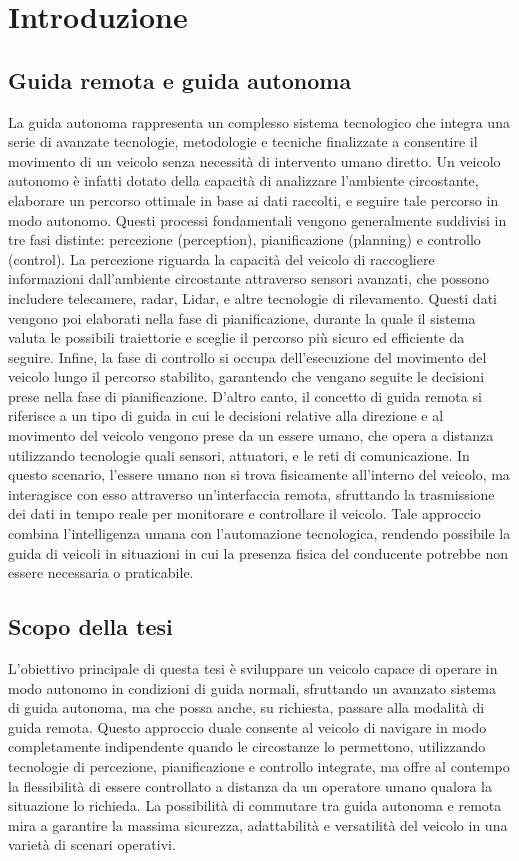 \section{Introduzione}
\subsection{Guida remota e guida autonoma}
La guida autonoma rappresenta un complesso sistema tecnologico che integra una serie di avanzate tecnologie, metodologie e tecniche finalizzate a consentire il movimento di un veicolo senza necessità di intervento umano diretto. Un veicolo autonomo è infatti dotato della capacità di analizzare l'ambiente circostante, elaborare un percorso ottimale in base ai dati raccolti, e seguire tale percorso in modo autonomo. Questi processi fondamentali vengono generalmente suddivisi in tre fasi distinte: percezione (perception), pianificazione (planning) e controllo (control).
La percezione riguarda la capacità del veicolo di raccogliere informazioni dall'ambiente circostante attraverso sensori avanzati, che possono includere telecamere, radar, Lidar, e altre tecnologie di rilevamento. Questi dati vengono poi elaborati nella fase di pianificazione, durante la quale il sistema valuta le possibili traiettorie e sceglie il percorso più sicuro ed efficiente da seguire. Infine, la fase di controllo si occupa dell'esecuzione del movimento del veicolo lungo il percorso stabilito, garantendo che vengano seguite le decisioni prese nella fase di pianificazione.
D'altro canto, il concetto di guida remota si riferisce a un tipo di guida in cui le decisioni relative alla direzione e al movimento del veicolo vengono prese da un essere umano, che opera a distanza utilizzando tecnologie quali sensori, attuatori, e le reti di comunicazione. In questo scenario, l'essere umano non si trova fisicamente all'interno del veicolo, ma interagisce con esso attraverso un'interfaccia remota, sfruttando la trasmissione dei dati in tempo reale per monitorare e controllare il veicolo. Tale approccio combina l'intelligenza umana con l'automazione tecnologica, rendendo possibile la guida di veicoli in situazioni in cui la presenza fisica del conducente potrebbe non essere necessaria o praticabile.
\subsection{Scopo della tesi}
L'obiettivo principale di questa tesi è sviluppare un veicolo capace di operare in modo autonomo in condizioni di guida normali, sfruttando un avanzato sistema di guida autonoma, ma che possa anche, su richiesta, passare alla modalità di guida remota. Questo approccio duale consente al veicolo di navigare in modo completamente indipendente quando le circostanze lo permettono, utilizzando tecnologie di percezione, pianificazione e controllo integrate, ma offre al contempo la flessibilità di essere controllato a distanza da un operatore umano qualora la situazione lo richieda. La possibilità di commutare tra guida autonoma e remota mira a garantire la massima sicurezza, adattabilità e versatilità del veicolo in una varietà di scenari operativi.
